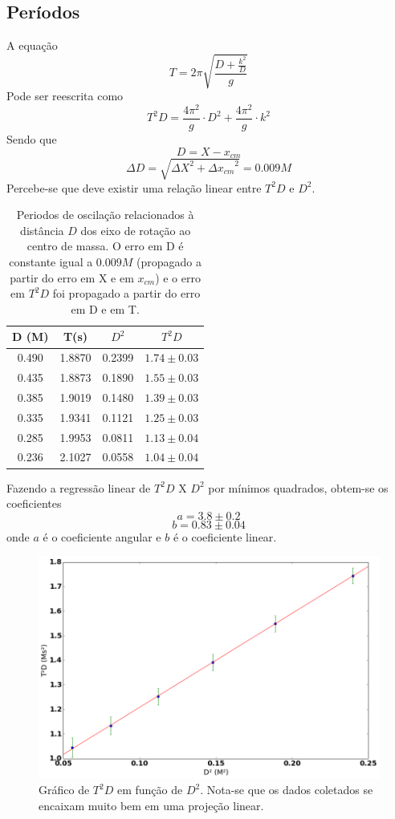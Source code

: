 \documentclass[12pt,a4paper]{article}
\begin{document}
\subsection{Períodos}
A equação $$ T = 2\pi\sqrt{\frac{D + \frac{k^2}{D}}{g}} $$ 
Pode ser reescrita como 
\begin{equation} \label{eq:funcao}
 T^2D = \frac{4\pi^2}{g} \cdot D^2 + \frac{4\pi^2}{g} \cdot k^2 
\end{equation}
Sendo que $$D = X - x_{cm} $$ 
$$ \Delta D = \sqrt{{\Delta X}^2 + {\Delta x_{cm}}^2}  = 0.009M$$
Percebe-se que deve existir uma relação linear entre $T^2D$ e $D^2$.
\newpage


  
\begin{table}[!htbp]
\caption{Periodos de oscilação relacionados à distância $D$ dos eixo de rotação ao centro de massa. O erro em D é constante igual a $0.009 M$ (propagado a partir do erro em X e em $x_{cm}$) e o erro em $T^2D$ foi propagado a partir do erro em D e em T.}
\def\arraystretch{1.5}
\begin{tabular}{|c|c|c|c|}
\hline
D (M)& T(s) & $D^2$ & $T^2D$ \\
\hline
0.490 & 1.8870 & 0.2399 & $1.74 \pm 0.03$\\
\hline
0.435 & 1.8873 & 0.1890 & $1.55 \pm 0.03$\\
\hline
0.385 & 1.9019 & 0.1480 & $1.39 \pm 0.03$\\
\hline
0.335 & 1.9341 & 0.1121 & $1.25 \pm 0.03$\\
\hline
0.285 & 1.9953 & 0.0811 & $1.13 \pm 0.04$\\
\hline
0.236 & 2.1027 & 0.0558 & $1.04 \pm 0.04$\\
\hline
\end{tabular} 

\end{table}
Fazendo a regressão linear de $T^2D$ X $D^2$ por mínimos quadrados, obtem-se os coeficientes $$ a = 3.8 \pm 0.2 $$  $$ b = 0.83 \pm 0.04 $$ onde $a$ é o coeficiente angular e $b$ é o coeficiente linear.

\begin{figure}[!hbtbp]

\includegraphics[scale=0.55]{index.png} 
\caption{Gráfico de $T^2D$ em função de $D^2$. Nota-se que os dados coletados se encaixam muito bem em uma projeção linear.}
\end{figure}
\end{document}
